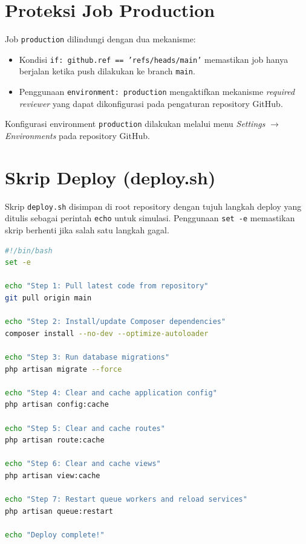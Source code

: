 \documentclass[a4paper,oneside,11pt]{book}
\begin{document}

\section{Proteksi Job Production}

Job \texttt{production} dilindungi dengan dua mekanisme:
\begin{itemize}
    \item Kondisi \texttt{if: github.ref == 'refs/heads/main'} memastikan job hanya berjalan ketika push dilakukan ke branch \texttt{main}.
    \item Penggunaan \texttt{environment: production} mengaktifkan mekanisme \textit{required reviewer} yang dapat dikonfigurasi pada pengaturan repository GitHub.
\end{itemize}

Konfigurasi environment \texttt{production} dilakukan melalui menu \textit{Settings} $\rightarrow$ \textit{Environments} pada repository GitHub.


\section{Skrip Deploy (deploy.sh)}

Skrip \texttt{deploy.sh} disimpan di root repository dengan tujuh langkah deploy yang ditulis sebagai perintah \texttt{echo} untuk simulasi. Penggunaan \texttt{set -e} memastikan skrip berhenti jika salah satu langkah gagal.

\begin{lstlisting}[language=bash, caption={Isi deploy.sh dengan tujuh langkah}]
#!/bin/bash
set -e

echo "Step 1: Pull latest code from repository"
git pull origin main

echo "Step 2: Install/update Composer dependencies"
composer install --no-dev --optimize-autoloader

echo "Step 3: Run database migrations"
php artisan migrate --force

echo "Step 4: Clear and cache application config"
php artisan config:cache

echo "Step 5: Clear and cache routes"
php artisan route:cache

echo "Step 6: Clear and cache views"
php artisan view:cache

echo "Step 7: Restart queue workers and reload services"
php artisan queue:restart

echo "Deploy complete!"
\end{lstlisting}
\end{document}
